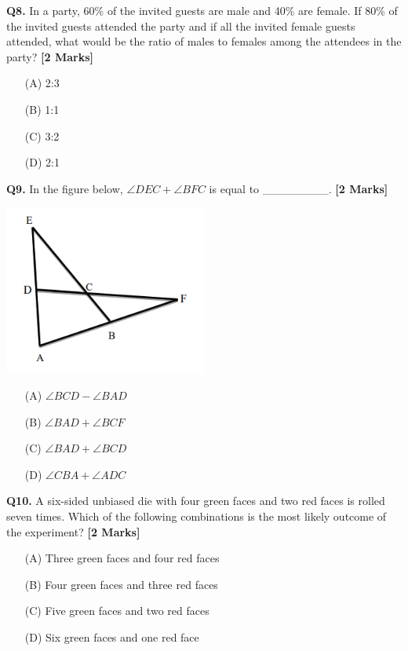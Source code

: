 \documentclass[11pt]{article}
\newcommand{\questionb}[2]{
    \noindent\textbf{Q#2.} #1 \hfill \textbf{[2 Marks]}
}
\begin{document}
\questionb{In a party, 60\% of the invited guests are male and 40\% are female. If 80\% of the invited guests attended the party and if all the invited female guests attended, what would be the ratio of males to females among the attendees in the party?}{8}
\begin{enumerate}
    \item[(A)] 2:3
    \item[(B)] 1:1
    \item[(C)] 3:2
    \item[(D)] 2:1
\end{enumerate}
\vspace{0.5cm}

\questionb{In the figure below, \( \angle DEC + \angle BFC \) is equal to \_\_\_\_\_\_\_\_.}{9}
\begin{center}
    
\includegraphics[width=0.5\textwidth]{figures/9}
\end{center}


\begin{enumerate}
    \item[(A)] \( \angle BCD - \angle BAD \)
    \item[(B)] \( \angle BAD + \angle BCF \)
    \item[(C)] \( \angle BAD + \angle BCD \)
    \item[(D)] \( \angle CBA + \angle ADC \)
\end{enumerate}
\vspace{0.5cm}

\questionb{A six-sided unbiased die with four green faces and two red faces is rolled seven times. Which of the following combinations is the most likely outcome of the experiment?}{10}
\begin{enumerate}
    \item[(A)] Three green faces and four red faces
    \item[(B)] Four green faces and three red faces
    \item[(C)] Five green faces and two red faces
    \item[(D)] Six green faces and one red face
\end{enumerate}
\vspace{0.5cm}
\end{document}
